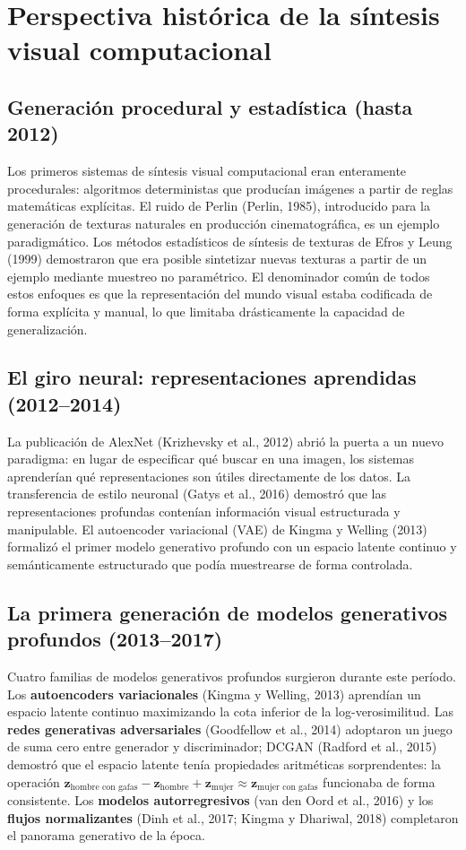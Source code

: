 \documentclass[12pt, a4paper, twoside]{book}
\newcommand{\z}{\mathbf{z}}
\begin{document}
\section{Perspectiva histórica de la síntesis visual computacional}
\label{sec:historia}

\subsection{Generación procedural y estadística (hasta 2012)}

Los primeros sistemas de síntesis visual computacional eran enteramente procedurales: algoritmos deterministas que producían imágenes a partir de reglas matemáticas explícitas. El ruido de Perlin (Perlin, 1985), introducido para la generación de texturas naturales en producción cinematográfica, es un ejemplo paradigmático. Los métodos estadísticos de síntesis de texturas de Efros y Leung (1999) demostraron que era posible sintetizar nuevas texturas a partir de un ejemplo mediante muestreo no paramétrico. El denominador común de todos estos enfoques es que la representación del mundo visual estaba codificada de forma explícita y manual, lo que limitaba drásticamente la capacidad de generalización.

\subsection{El giro neural: representaciones aprendidas (2012--2014)}

La publicación de AlexNet (Krizhevsky et al., 2012) abrió la puerta a un nuevo paradigma: en lugar de especificar qué buscar en una imagen, los sistemas aprenderían qué representaciones son útiles directamente de los datos. La transferencia de estilo neuronal (Gatys et al., 2016) demostró que las representaciones profundas contenían información visual estructurada y manipulable. El autoencoder variacional (VAE) de Kingma y Welling (2013) formalizó el primer modelo generativo profundo con un espacio latente continuo y semánticamente estructurado que podía muestrearse de forma controlada.

\subsection{La primera generación de modelos generativos profundos (2013--2017)}

Cuatro familias de modelos generativos profundos surgieron durante este período. Los \textbf{autoencoders variacionales} (Kingma y Welling, 2013) aprendían un espacio latente continuo maximizando la cota inferior de la log-verosimilitud. Las \textbf{redes generativas adversariales} (Goodfellow et al., 2014) adoptaron un juego de suma cero entre generador y discriminador; DCGAN (Radford et al., 2015) demostró que el espacio latente tenía propiedades aritméticas sorprendentes: la operación $\z_{\text{hombre con gafas}} - \z_{\text{hombre}} + \z_{\text{mujer}} \approx \z_{\text{mujer con gafas}}$ funcionaba de forma consistente. Los \textbf{modelos autorregresivos} (van den Oord et al., 2016) y los \textbf{flujos normalizantes} (Dinh et al., 2017; Kingma y Dhariwal, 2018) completaron el panorama generativo de la época.
\end{document}
